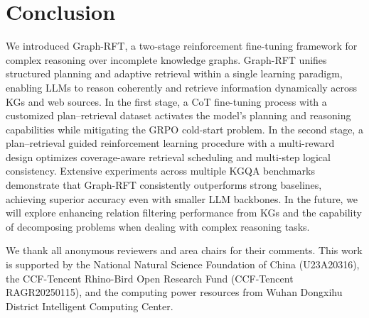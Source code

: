 \documentclass[sigconf]{acmart}
\begin{document}
\section{Conclusion}
We introduced Graph-RFT, a two-stage reinforcement fine-tuning framework for complex reasoning over incomplete knowledge graphs. Graph-RFT unifies structured planning and adaptive retrieval within a single learning paradigm, enabling LLMs to reason coherently and retrieve information dynamically across KGs and web sources.
In the first stage, a CoT fine-tuning process with a customized plan–retrieval dataset activates the model’s planning and reasoning capabilities while mitigating the GRPO cold-start problem. In the second stage, a plan–retrieval guided reinforcement learning procedure with a multi-reward design optimizes coverage-aware retrieval scheduling and multi-step logical consistency.
Extensive experiments across multiple KGQA benchmarks demonstrate that Graph-RFT consistently outperforms strong baselines, achieving superior accuracy even with smaller LLM backbones.
In the future, we will explore enhancing relation
filtering performance from KGs and the capability of decomposing problems when dealing with complex reasoning tasks.

\begin{acks}
We thank all anonymous reviewers and area chairs for their comments. This work is supported by the National Natural Science Foundation of China (U23A20316), the CCF-Tencent Rhino-Bird Open Research Fund (CCF-Tencent RAGR20250115), and the computing power resources from Wuhan Dongxihu District Intelligent Computing Center.
\end{acks}
\end{document}
